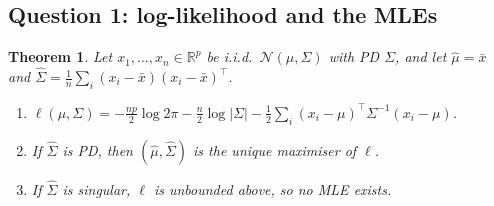\documentclass[11pt]{article}
\newcommand{\R}{\mathbb{R}}
\newcommand{\T}{^{\top}}
\newcommand{\hSigma}{\hat{\Sigma}}
\newcommand{\hmu}{\hat{\mu}}
\theoremstyle{plain}
\newtheorem{theorem}{Theorem}
\theoremstyle{definition}
\theoremstyle{remark}
\begin{document}
\subsection{Question 1: log-likelihood and the MLEs}
\begin{theorem}\label{thm:mle}
Let $x_1,\dots,x_n\in\R^p$ be i.i.d.\ $\mathcal N(\mu,\Sigma)$ with PD $\Sigma$, and let
$\hmu=\bar x$ and $\hSigma=\frac1n\sum_i(x_i-\bar x)(x_i-\bar x)\T$.
\begin{enumerate}[label=(\alph*),nosep]
\item $\ell(\mu,\Sigma)=-\frac{np}{2}\log2\pi-\frac n2\log|\Sigma|
 -\frac12\sum_i(x_i-\mu)\T\Sigma^{-1}(x_i-\mu)$.
\item If $\hSigma$ is PD, then $(\hmu,\hSigma)$ is the unique maximiser of $\ell$.
\item If $\hSigma$ is singular, $\ell$ is unbounded above, so no MLE exists.
\end{enumerate}
\end{theorem}
\end{document}
